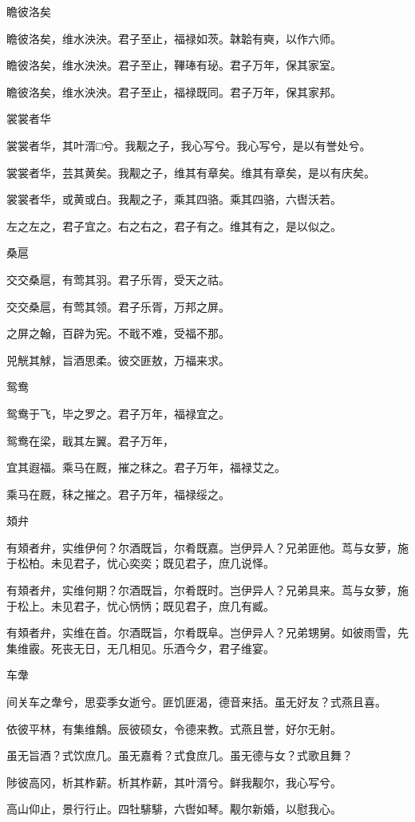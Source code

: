 瞻彼洛矣

瞻彼洛矣，维水泱泱。君子至止，福禄如茨。韎韐有奭，以作六师。

瞻彼洛矣，维水泱泱。君子至止，鞸琫有珌。君子万年，保其家室。

瞻彼洛矣，维水泱泱。君子至止，福禄既同。君子万年，保其家邦。

裳裳者华

裳裳者华，其叶湑□兮。我觏之子，我心写兮。我心写兮，是以有誉处兮。

裳裳者华，芸其黄矣。我觏之子，维其有章矣。维其有章矣，是以有庆矣。

裳裳者华，或黄或白。我觏之子，乘其四骆。乘其四骆，六辔沃若。

左之左之，君子宜之。右之右之，君子有之。维其有之，是以似之。

桑扈

交交桑扈，有莺其羽。君子乐胥，受天之祜。

交交桑扈，有莺其领。君子乐胥，万邦之屏。

之屏之翰，百辟为宪。不戢不难，受福不那。

兕觥其觩，旨酒思柔。彼交匪敖，万福来求。

鸳鸯

鸳鸯于飞，毕之罗之。君子万年，福禄宜之。

鸳鸯在梁，戢其左翼。君子万年，

宜其遐福。乘马在厩，摧之秣之。君子万年，福禄艾之。

乘马在厩，秣之摧之。君子万年，福禄绥之。

頍弁

有頍者弁，实维伊何？尔酒既旨，尔肴既嘉。岂伊异人？兄弟匪他。茑与女萝，施于松柏。未见君子，忧心奕奕；既见君子，庶几说怿。

有頍者弁，实维何期？尔酒既旨，尔肴既时。岂伊异人？兄弟具来。茑与女萝，施于松上。未见君子，忧心怲怲；既见君子，庶几有臧。

有頍者弁，实维在首。尔酒既旨，尔肴既阜。岂伊异人？兄弟甥舅。如彼雨雪，先集维霰。死丧无日，无几相见。乐酒今夕，君子维宴。

车舝

间关车之舝兮，思娈季女逝兮。匪饥匪渴，德音来括。虽无好友？式燕且喜。

依彼平林，有集维鷮。辰彼硕女，令德来教。式燕且誉，好尔无射。

虽无旨酒？式饮庶几。虽无嘉肴？式食庶几。虽无德与女？式歌且舞？

陟彼高冈，析其柞薪。析其柞薪，其叶湑兮。鲜我觏尔，我心写兮。

高山仰止，景行行止。四牡騑騑，六辔如琴。觏尔新婚，以慰我心。

